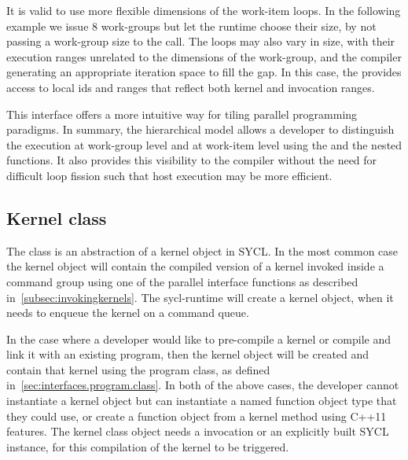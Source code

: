 It is valid to use more flexible dimensions of the work-item loops. In
the following example we issue 8 work-groups but let the runtime
choose their size, by not passing a work-group size to the
 call. The
 loops may also vary in size, with
their execution ranges unrelated to the dimensions of the work-group,
and the compiler generating an appropriate iteration space to fill the
gap. In this case, the  provides access to local ids and
ranges that reflect both kernel and  invocation ranges.


This interface offers a more intuitive way for tiling parallel
programming paradigms. In summary, the hierarchical model allows a
developer to distinguish the execution at work-group level and at
work-item level using the  and the nested
 functions. It also provides this visibility
to the compiler without the need for difficult loop fission such that
host execution may be more efficient.




\subsection{Kernel class}
\label{subsec:kernel.class}

The  class is an abstraction of a \gls{kernel} object
in SYCL. In the
most common case the kernel object will contain the compiled version of a kernel
invoked inside a command group using one of the parallel interface functions as
described in~\ref{subsec:invokingkernels}. The \gls{sycl-runtime} will create
a kernel object, when it needs to enqueue the kernel on a command queue.

In the case where a developer would like to pre-compile a kernel or compile and
link it with an existing program, then the kernel object will be created and
contain that kernel using the program class, as defined
in~\ref{sec:interfaces.program.class}. In both of the above cases, the developer
cannot instantiate a kernel object but can instantiate a named function object type
that they could use, or create a function object from a kernel method using C++11 features.
The kernel class object needs a  invocation or an
explicitly built SYCL  instance, for this compilation of the kernel to be triggered.

